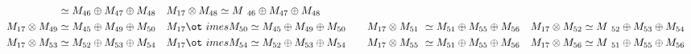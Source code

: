 \begin{align*}
{} \simeq M_{46} \oplus M_{47} \oplus M_{48} &&& M_{17} \otimes M_{48} \simeq M\
_{46} \oplus M_{47} \oplus M_{48}\\
M_{17} \otimes M_{49} \simeq M_{45} \oplus M_{49} \oplus M_{50} &&& M_{17} \ot\
imes M_{50} \simeq M_{45} \oplus M_{49} \oplus M_{50} &&& M_{17} \otimes M_{51\
} \simeq M_{51} \oplus M_{55} \oplus M_{56} &&& M_{17} \otimes M_{52} \simeq M\
_{52} \oplus M_{53} \oplus M_{54}\\
M_{17} \otimes M_{53} \simeq M_{52} \oplus M_{53} \oplus M_{54} &&& M_{17} \ot\
imes M_{54} \simeq M_{52} \oplus M_{53} \oplus M_{54} &&& M_{17} \otimes M_{55\
} \simeq M_{51} \oplus M_{55} \oplus M_{56} &&& M_{17} \otimes M_{56} \simeq M\
_{51} \oplus M_{55} \oplus M_{56}\\
\end{align*}

